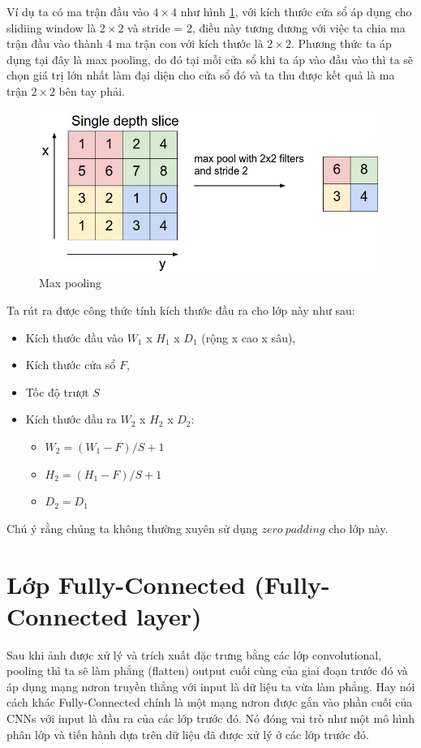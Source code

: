 Ví dụ ta có ma trận đầu vào $4\times 4$  như hình \ref{fig:poolExample}, với kích thước cửa sổ áp dụng cho slidiing window là $2\times 2$ và stride = 2, điều này tương đương với việc ta chia ma trận đầu vào thành 4 ma trận con với kích thước là $2\times2$.  Phương thức ta áp dụng tại đây là max pooling, do đó tại mỗi cửa sổ khi ta áp vào đầu vào thì ta sẽ chọn giá trị lớn nhất làm đại diện cho cửa sổ đó và ta thu được kết quả là ma trận $2\times2$ bên tay phải.\par
\begin{center}
\begin{figure}[htp]
	\begin{center}
		\includegraphics[scale=0.5]{chap4/image/maxpoolEx.jpeg}
	\end{center}
	\caption{Max pooling}
	\label{fig:poolExample}
\end{figure}
\end{center}
Ta rút ra được công thức tính kích thước đầu ra cho lớp này như sau:
\begin{itemize}
	\item Kích thước đầu vào \textbf{$W_1$} x \textbf{$H_1$} x \textbf{$D_1$} (rộng x cao x sâu),
	\item Kích thước cửa sổ \textbf{$F$},	
	\item Tốc độ trượt \textbf{$S$}
	\item Kích thước đầu ra \textbf{$W_2$} x \textbf{$H_2$} x \textbf{$D_2$}:
	\begin{itemize}
		\item  \textbf{$W_2 = (W_1 - F)/S +1$}
		\item  \textbf{$H_2 = (H_1 - F)/S +1$}
		\item \textbf{$D_2 = D_1$}
	\end{itemize}	 
\end{itemize}
Chú ý rằng chúng ta không thường xuyên sử dụng $zero~padding$ cho lớp này.
\section{Lớp Fully-Connected (Fully-Connected layer)}
Sau khi ảnh được xử lý và trích xuất đặc trưng bằng các lớp convolutional, pooling thì ta sẽ làm phẳng (flatten) output cuối cùng của giai đoạn trước đó và áp dụng mạng nơron truyền thẳng với input là dữ liệu ta vừa làm phẳng. Hay nói cách khác Fully-Connected chính là một mạng nơron được gắn vào phần cuối của CNNs với input là đầu ra của các lớp trước đó. Nó đóng vai trò như một mô hình phân lớp và tiến hành dựa trên dữ liệu đã được xử lý ở các lớp trước đó.
